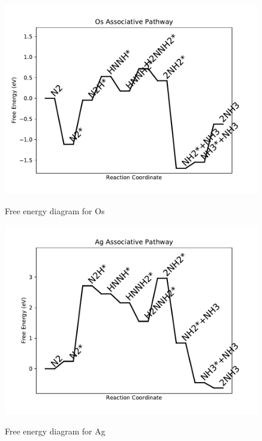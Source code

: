 \documentclass{article}
\begin{document}
\newpage
\begin{figure}
\includegraphics[width=1\linewidth]{data/plots/Os_associative.pdf}
\label{fig:Os_associative}
\caption{Free energy diagram for Os}
\end{figure}

\begin{figure}
\includegraphics[width=1\linewidth]{data/plots/Ag_associative.pdf}
\label{fig:Ag_associative}
\caption{Free energy diagram for Ag}
\end{figure}
\end{document}
